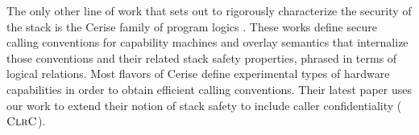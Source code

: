 \documentclass[10pt,conference]{ieeetran}%
\theoremstyle{definition}
\begin{document}
The only other line of work that sets out to rigorously characterize the
security of the stack is the Cerise family of program logics
\cite{SkorstengaardLocal, SkorstengaardSTKJFP, Georges22:TempsDesCerises}.
These works define secure calling conventions for capability machines and
overlay semantics that internalize those conventions and their related stack
safety properties, phrased in terms of logical relations. Most flavors of
Cerise define experimental types of hardware capabilities in order to obtain
efficient calling conventions. Their latest paper
\cite{Georges22:TempsDesCerises} uses our work to extend their notion of stack
safety to include caller confidentiality (\(\textnormal{\sc ClrC}\)).


\end{document}
